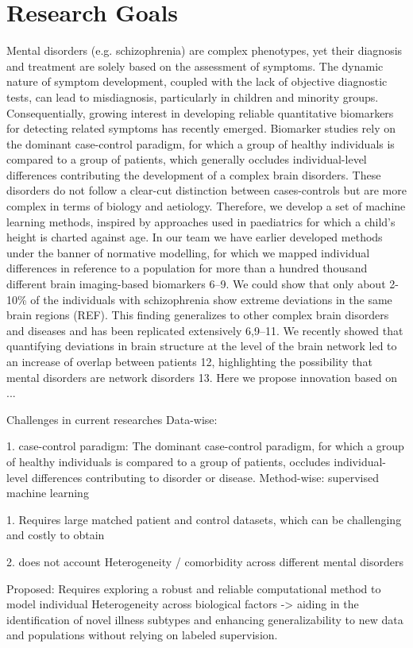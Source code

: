 \section{Research Goals}\label{sec:research_goals}
Mental disorders (e.g. schizophrenia) are complex phenotypes\cite{insel2009disruptive,kapur2012has,stephan2015translational,hitchcock2022computational}, yet their diagnosis and treatment are solely based on the assessment of symptoms\cite{kapur2012has,stephan2015translational,hitchcock2022computational,scarr2015biomarkers}. The dynamic nature of symptom development, coupled with the lack of objective diagnostic tests, can lead to misdiagnosis, particularly in children and minority groups\cite{merten2017overdiagnosis,gara2019naturalistic}. Consequentially, growing interest in developing reliable quantitative biomarkers for detecting related symptoms has recently emerged. Biomarker studies rely on the dominant case-control paradigm, for which a group of healthy individuals is compared to a group of patients, which generally occludes individual-level differences contributing the development of a complex brain disorders. These disorders do not follow a clear-cut distinction between cases-controls but are more complex in terms of biology and aetiology. Therefore, we develop a set of machine learning methods, inspired by approaches used in paediatrics for which a child’s height is charted against age. In our team we have earlier developed methods under the banner of normative modelling, for which we mapped individual differences in reference to a population for more than a hundred thousand different brain imaging-based biomarkers  6–9. We could show that only about 2-10\% of the individuals with schizophrenia show extreme deviations in the same brain regions (REF). This finding generalizes to other complex brain disorders and diseases and has been replicated extensively 6,9–11. We recently showed that quantifying deviations in brain structure at the level of the brain network led to an increase of overlap between patients 12, highlighting the possibility that mental disorders are network disorders 13. Here we propose innovation based on ...


Challenges in current researches
Data-wise:

1. case-control paradigm: The dominant case-control paradigm, for which a group of healthy individuals is compared to a group of patients, occludes individual-level differences contributing to disorder or disease.
Method-wise: supervised machine learning

1. Requires large matched patient and control datasets, which can be challenging and costly to obtain

2. does not account Heterogeneity / comorbidity across different mental disorders

Proposed:
Requires exploring a robust and reliable computational method to model individual Heterogeneity across biological factors
-> aiding in the identification of novel illness subtypes and enhancing generalizability to new data and populations without relying on labeled supervision.

